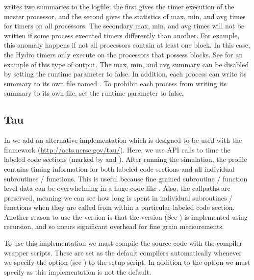 writes two summaries to the logfile: 
the first gives the timer execution of the master
processor, and the second gives the statistics of max, min, and avg
times for timers on all processors.  The secondary max, min, and avg times will not be 
written if some process executed timers differently than another.  For example,
this anomaly happens if not all processors contain at least one block.  In this case, 
the \unit{Hydro} timers only execute on the processors that possess blocks.
See  for an example of this type of output.
The max, min, and avg summary can be disabled by setting the runtime parameter
 to false.  In addition, each process can write its 
summary to its own file named .  To prohibit
each process from writing its summary to its own file, set the runtime
parameter  to false.

\subsection{Tau}
In  we add an alternative  implementation
which is designed to be used with the  framework
(\url{http://acts.nersc.gov/tau/}).  Here, we use  API calls
to time the  labeled code sections (marked by
 and ).  After running the
simulation, the  profile contains timing information for
both  labeled code sections and all individual subroutines
/ functions.  This is useful because fine grained subroutine /
function level data can be overwhelming in a huge code like
.  Also, the callpaths are preserved, meaning we can see
how long is spent in individual subroutines / functions when they are
called from within a particular  labeled code section.
Another reason to use the  version is that the
 version (See ) is implemented
using recursion, and so incurs significant overhead for fine grain
measurements.

To use this implementation we must compile the  source
code with the  compiler wrapper scripts.  These are set as
the default compilers automatically whenever we specify the
 option (see ) to the setup
script.  In addition to the  option we must specify
 as this 
implementation is not the default.


